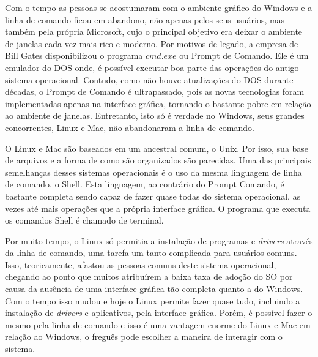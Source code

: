 Com o tempo as pessoas se acostumaram com o ambiente gráfico do Windows e a linha de comando ficou em abandono, não apenas pelos seus usuários, mas também pela própria Microsoft, cujo o principal objetivo era deixar o ambiente de janelas cada vez mais rico e moderno. Por motivos de legado, a empresa de Bill Gates disponibilizou o programa $cmd.exe$ ou Prompt de Comando. Ele é um emulador do DOS onde, é possível executar boa parte das operações do antigo sistema operacional. Contudo, como não houve atualizações do DOS durante décadas, o Prompt de Comando é ultrapassado, pois as novas tecnologias foram implementadas apenas na interface gráfica, tornando-o bastante pobre em relação ao ambiente de janelas. Entretanto, isto só é verdade no Windows, seus grandes concorrentes, Linux e Mac, não abandonaram a linha de comando.

O Linux e Mac são baseados em um ancestral comum, o Unix. Por isso, sua base de arquivos e a forma de como são organizados são parecidas. Uma das principais semelhanças desses sistemas operacionais é o uso da mesma linguagem de linha de comando, o Shell. Esta linguagem, ao contrário do Prompt Comando, é bastante completa sendo capaz de fazer quase todas do sistema operacional, as vezes até mais operações que a própria interface gráfica. O programa que executa os comandos Shell é chamado de terminal.


Por muito tempo, o Linux só permitia a instalação de programas e \emph{drivers} através da linha de comando, uma tarefa um tanto complicada para usuários comuns. Isso, teoricamente, afastou as pessoas comuns deste sistema operacional, chegando ao ponto que muitos atribuírem a baixa taxa de adoção do SO por causa da ausência de uma interface gráfica tão completa quanto a do Windows. Com o tempo isso mudou e hoje o Linux permite fazer quase tudo, incluindo a instalação de \emph{drivers} e aplicativos, pela interface gráfica. Porém, é possível fazer o mesmo pela linha de comando e isso é uma vantagem enorme do Linux e Mac em relação ao Windows, o freguês pode escolher a maneira de interagir com o sistema. 

